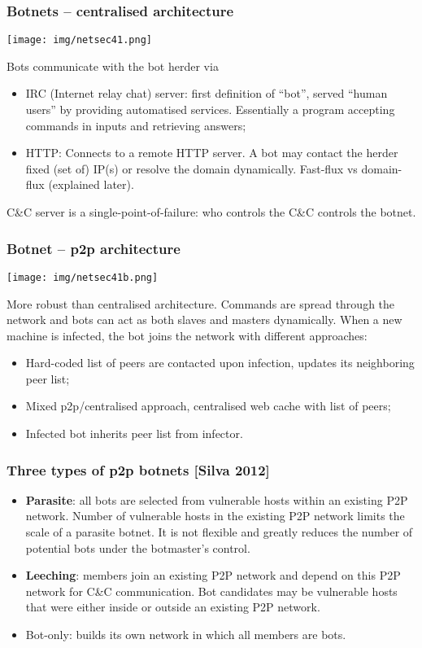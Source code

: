 \documentclass[a4paper, 10pt, titlepage]{article}
\begin{document}
\subsubsection*{Botnets – centralised architecture}
\begin{center}
	\texttt{[image: img/netsec41.png]}
\end{center}
Bots communicate with the bot herder via
\begin{itemize}
	\item IRC (Internet relay chat) server: first definition of “bot”, served “human users” by providing automatised services. Essentially a program accepting commands in inputs and retrieving answers;
	\item HTTP: Connects to a remote HTTP server. A bot may contact the herder fixed (set of) IP(s) or resolve the domain dynamically. Fast-flux vs domain-flux (explained later).
\end{itemize}
C\&C server is a single-point-of-failure: who controls the C\&C controls the botnet.

\subsubsection*{Botnet – p2p architecture}
\begin{center}
	\texttt{[image: img/netsec41b.png]}
\end{center}
More robust than centralised architecture. Commands are spread through the network and bots can act as both slaves and masters dynamically. When a new machine is infected, the bot joins the network with different approaches:
\begin{itemize}
	\item Hard-coded list of peers are contacted upon infection, updates its neighboring peer list;
	\item Mixed p2p/centralised approach, centralised web cache with list of peers;
	\item Infected bot inherits peer list from infector.
\end{itemize}

\subsubsection*{Three types of p2p botnets [Silva 2012]}
\begin{itemize}
	\item \textbf{Parasite}: all bots are selected from vulnerable hosts within an existing P2P network. Number of vulnerable hosts in the existing P2P network limits the scale of a parasite botnet. It is not flexible and greatly reduces the number of potential bots under the botmaster’s control.
	\item \textbf{Leeching}: members join an existing P2P network and depend on this P2P network for C\&C communication. Bot candidates may be vulnerable hosts that were either inside or outside an existing P2P network.
	\item Bot-only: builds its own network in which all members are bots.
\end{itemize}
\end{document}
